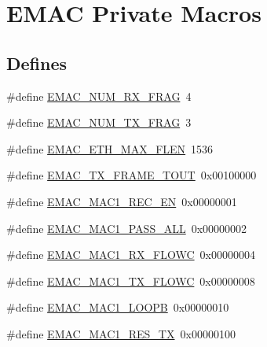 \hypertarget{group___e_m_a_c___private___macros}{\section{\-E\-M\-A\-C \-Private \-Macros}
\label{group___e_m_a_c___private___macros}
}
\subsection*{\-Defines}
\begin{DoxyCompactItemize}
\item 
\#define \hyperlink{group___e_m_a_c___private___macros_gad32b6ab5507a03edf7ce86ec720e187d}{\-E\-M\-A\-C\-\_\-\-N\-U\-M\-\_\-\-R\-X\-\_\-\-F\-R\-A\-G}~4
\item 
\#define \hyperlink{group___e_m_a_c___private___macros_ga935cd0225e96d031ea7f484d614f10c6}{\-E\-M\-A\-C\-\_\-\-N\-U\-M\-\_\-\-T\-X\-\_\-\-F\-R\-A\-G}~3
\item 
\#define \hyperlink{group___e_m_a_c___private___macros_ga58d37bc982406d2dfc86503abb1e5abe}{\-E\-M\-A\-C\-\_\-\-E\-T\-H\-\_\-\-M\-A\-X\-\_\-\-F\-L\-E\-N}~1536
\item 
\#define \hyperlink{group___e_m_a_c___private___macros_ga0596726d2853b075fadaab586de2d8b0}{\-E\-M\-A\-C\-\_\-\-T\-X\-\_\-\-F\-R\-A\-M\-E\-\_\-\-T\-O\-U\-T}~0x00100000
\item 
\#define \hyperlink{group___e_m_a_c___private___macros_ga514e4a822ef6829cf7223df3a1fd3b81}{\-E\-M\-A\-C\-\_\-\-M\-A\-C1\-\_\-\-R\-E\-C\-\_\-\-E\-N}~0x00000001
\item 
\#define \hyperlink{group___e_m_a_c___private___macros_gaecafe47b0ef6bf3e0ac573bb56f58649}{\-E\-M\-A\-C\-\_\-\-M\-A\-C1\-\_\-\-P\-A\-S\-S\-\_\-\-A\-L\-L}~0x00000002
\item 
\#define \hyperlink{group___e_m_a_c___private___macros_gad4f3ddb733bc33448a27756ab654eee4}{\-E\-M\-A\-C\-\_\-\-M\-A\-C1\-\_\-\-R\-X\-\_\-\-F\-L\-O\-W\-C}~0x00000004
\item 
\#define \hyperlink{group___e_m_a_c___private___macros_ga5861d6dc2848901882a326acad8feee7}{\-E\-M\-A\-C\-\_\-\-M\-A\-C1\-\_\-\-T\-X\-\_\-\-F\-L\-O\-W\-C}~0x00000008
\item 
\#define \hyperlink{group___e_m_a_c___private___macros_ga5d1a3767e7126ac8ac3db9845435efc3}{\-E\-M\-A\-C\-\_\-\-M\-A\-C1\-\_\-\-L\-O\-O\-P\-B}~0x00000010
\item 
\#define \hyperlink{group___e_m_a_c___private___macros_ga23449e5e01f55c76e9eba4f710a3a142}{\-E\-M\-A\-C\-\_\-\-M\-A\-C1\-\_\-\-R\-E\-S\-\_\-\-T\-X}~0x00000100

\end{DoxyCompactItemize}
